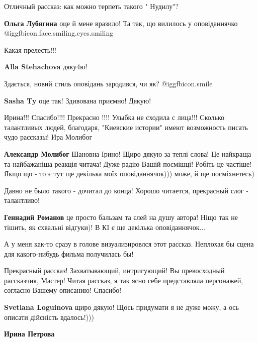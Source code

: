 \begin{itemize}
Отличный рассказ: как можно терпеть такого " Нудилу"?

\textbf{Ольга Лубягина} оце й мене вразило! Та так, що вилилось у оповіданнячко @igg{fbicon.face.smiling.eyes.smiling} 

Какая прелесть!!!

\textbf{Alla Stehachova} дяку4ю!

Здається, новий стиль оповідань зародився, чи як?
 @igg{fbicon.smile} 

\textbf{Sasha Ty} оце так! Здивована приємно! Дякую!


Ирина!!! Спасибо!!!! Прекрасно !!!! Улыбка не сходила с лица!!! Сколько
талантливых людей, благодаря, "Киевские истории" имеют возможность писать чудо
рассказы! Ира Молибог

\begin{itemize} %
\textbf{Александр Молибог} Шановна Ірино! Щиро дякую за теплі слова! Це найкраща та найбажаніша реакція читача! Дуже радію Вашій посмішці! Робіть це частіше! Якщо що - то є тут ще декілька моїх оповіданнячок))) може, й ще посміхнетесь)
\end{itemize} %

Давно не было такого - дочитал до конца! Хорошо читается, прекрасный слог - талантливо!

\begin{itemize} %
\textbf{Геннадий Романов} це просто бальзам та єлей на душу автора! Ніщо так не тішить, як схвальні відгуки)! В КІ є ще декілька оповіданнячок...
\end{itemize} %

А у меня как-то сразу в голове визуализировлся этот рассказ. Неплохая бы сцена для какого-нибудь фильма получилась бы!


Прекрасный рассказ! Захватывающий, интригующий! Вы превосходный рассказчик,
Мастер! Читая рассказ, я так ясно себе представляла персонажей, согласно Вашему
описанию! Спасибо!

\begin{itemize} %
\textbf{Svetlana Loguinova} щиро дякую! Щось придумати я не дуже можу, а ось описати дійсність вдалось!)))

\textbf{Ирина Петрова}


\end{itemize}
\end{itemize}
